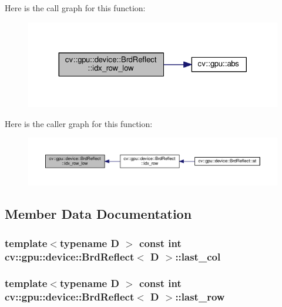 Here is the call graph for this function\-:\nopagebreak
\begin{figure}[H]
\begin{center}
\leavevmode
\includegraphics[width=324pt]{structcv_1_1gpu_1_1device_1_1BrdReflect_ab29583a8857509e4b7696febb527d035_cgraph}
\end{center}
\end{figure}




Here is the caller graph for this function\-:\nopagebreak
\begin{figure}[H]
\begin{center}
\leavevmode
\includegraphics[width=350pt]{structcv_1_1gpu_1_1device_1_1BrdReflect_ab29583a8857509e4b7696febb527d035_icgraph}
\end{center}
\end{figure}




\subsection{Member Data Documentation}
\hypertarget{structcv_1_1gpu_1_1device_1_1BrdReflect_a2bdcb0caecf6680f4aad41dff5a3da5b}{
\subsubsection[{last\-\_\-col}]{\setlength{\rightskip}{0pt plus 5cm}template$<$typename D $>$ const int {\bf cv\-::gpu\-::device\-::\-Brd\-Reflect}$<$ D $>$\-::last\-\_\-col}}\label{structcv_1_1gpu_1_1device_1_1BrdReflect_a2bdcb0caecf6680f4aad41dff5a3da5b}
\hypertarget{structcv_1_1gpu_1_1device_1_1BrdReflect_aff56dc6cb266775d6b61c2751b2a7a55}{
\subsubsection[{last\-\_\-row}]{\setlength{\rightskip}{0pt plus 5cm}template$<$typename D $>$ const int {\bf cv\-::gpu\-::device\-::\-Brd\-Reflect}$<$ D $>$\-::last\-\_\-row}}\label{structcv_1_1gpu_1_1device_1_1BrdReflect_aff56dc6cb266775d6b61c2751b2a7a55}


